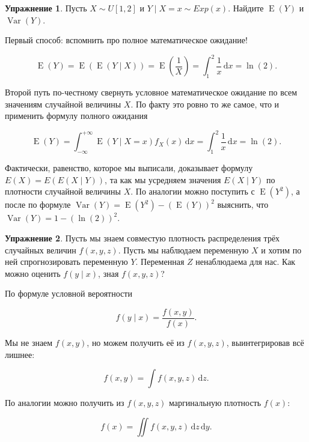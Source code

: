 \documentclass[12pt, a4paper, oneside]{extreport}
\DeclareMathOperator{\Var}{Var}
\DeclareMathOperator{\E}{\mathop{E}}
\newcommand{\dx}[1]{\,\mathrm{d}#1} %
\theoremstyle{plain}              %
\theoremstyle{definition}         %
\newtheorem{problem}{\color{myblue} Упражнение}
\begin{document}
\begin{problem}
Пусть $X \sim U[1,2]$ и  $Y \mid X=x \sim Exp(x)$. Найдите $\E(Y)$ и $\Var(Y)$. 

\begin{sol} 
Первый способ: вспомнить про полное математическое ожидание! 

\[ \E(Y) = \E(\E(Y \mid X)) = \E\left(\frac{1}{X}\right) = \int_1^2 \frac{1}{x} \dx{x} = \ln(2). \]

Второй путь по-честному свернуть условное математическое ожидание по всем значениям случайной величины $X$. По факту это ровно то же самое, что и применить формулу полного ожидания

\[ \E(Y) = \int_{-\infty}^{+\infty} \E(Y \mid X = x) f_X(x) \dx{x} = \int_1^2 \frac{1}{x} \dx{x} = \ln(2).\]

Фактически, равенство,  которое мы выписали, доказывает формулу $E(X) = E(E(X \mid Y))$, та как мы усредняем значения $E(X \mid Y)$ по плотности случайной величины $X$. По аналогии можно поступить с $\E(Y^2)$, а после по формуле $\Var(Y) = \E(Y^2) - (\E(Y))^2$ выяснить, что $\Var(Y) = 1 - (\ln(2))^2$.
\end{sol} 
\end{problem}


\begin{problem} 
Пусть мы знаем совместую плотность распределения трёх случайных величин  $f(x,y,z)$.  Пусть мы наблюдаем переменную $X$ и хотим по ней спрогнозировать переменную $Y$. Переменная $Z$ ненаблюдаема для нас. Как можно оценить $f(y \mid x)$, зная $f(x,y,z)$? 

\begin{sol}
По формуле условной вероятности 

\[f(y \mid x) = \frac{f(x,y)}{f(x)}.\]

Мы не знаем $f(x,y)$, но можем получить её из $f(x,y,z)$, выинтегрировав всё лишнее: 

\[ f(x,y) = \int f(x,y,z) \dx{z}. \]

По аналогии можно получить из $f(x,y,z)$ маргинальную плотность $f(x)$: 

\[ f(x) = \iint f(x,y,z) \dx{z}\dx{y}. \]
\end{sol}
\end{problem}
\end{document}
